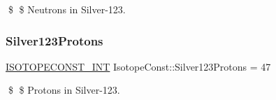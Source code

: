 \$ \$ Neutrons in Silver-\/123. \mbox{\label{group___isotope_const-_silver-_ag123_gad360075ad24dfc3470a0a2007d33baf8}} 
\subsubsection{\texorpdfstring{Silver123\+Protons}{Silver123Protons}}
{\footnotesize\ttfamily \mbox{\hyperlink{group___isotope_const-_macros_ga5f18360b3e99483a35c32d789e62621c}{I\+S\+O\+T\+O\+P\+E\+C\+O\+N\+S\+T\+\_\+\+I\+NT}} Isotope\+Const\+::\+Silver123\+Protons = 47}

\$ \$ Protons in Silver-\/123. 